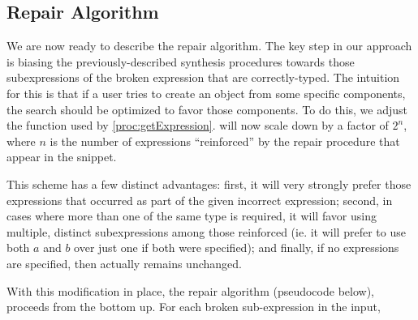 \subsection{Repair Algorithm}
\label{sec:algorithm:repair}
We are now ready to describe the repair algorithm. The key step in our approach is biasing the previously-described synthesis procedures towards those subexpressions of the broken expression that are correctly-typed. The intuition for this is that if a user tries to create an object from some specific components, the search should be optimized to favor those components. To do this, we adjust the \Cost function used by \ref{proc:getExpression}. \Cost will now scale down by a factor of $2^n$, where $n$ is the number of expressions ``reinforced'' by the repair procedure that appear in the snippet.

This scheme has a few distinct advantages: first, it will very strongly prefer those expressions that occurred as part of the given incorrect expression; second, in cases where more than one of the same type is required, it will favor using multiple, distinct subexpressions among those reinforced (ie. it will prefer to use both $a$ and $b$ over just one if both were specified); and finally, if no expressions are specified, then \Cost actually remains unchanged.

With this modification in place, the repair algorithm (pseudocode below), proceeds from the bottom up. For each broken sub-expression in the input, 

